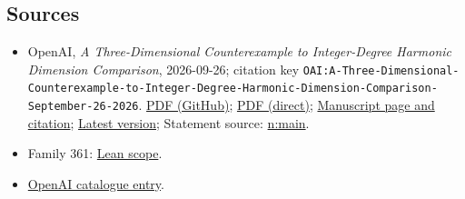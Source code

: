 \documentclass[11pt]{article}
\begin{document}
\subsection{Sources}
\begin{itemize}
\item OpenAI, \emph{A Three-Dimensional Counterexample to Integer-Degree Harmonic Dimension Comparison}, 2026-09-26; citation key \texttt{OAI:A-Three-Dimensional-Counterexample-to-Integer-Degree-Harmonic-Dimension-Comparison-September-26-2026}. \href{https://github.com/openai/math/blob/adc7f1241b42e322a6451854ab7e4b4c146bf78a/preprints/A-Three-Dimensional-Counterexample-to-Integer-Degree-Harmonic-Dimension-Comparison-September-26-2026/paper.pdf}{PDF (GitHub)}; \href{https://github.com/openai/math/raw/adc7f1241b42e322a6451854ab7e4b4c146bf78a/preprints/A-Three-Dimensional-Counterexample-to-Integer-Degree-Harmonic-Dimension-Comparison-September-26-2026/paper.pdf}{PDF (direct)}; \href{https://github.com/openai/math/blob/adc7f1241b42e322a6451854ab7e4b4c146bf78a/preprints/A-Three-Dimensional-Counterexample-to-Integer-Degree-Harmonic-Dimension-Comparison-September-26-2026/README.md}{Manuscript page and citation}; \href{https://github.com/openai/math/blob/main/preprints/A-Three-Dimensional-Counterexample-to-Integer-Degree-Harmonic-Dimension-Comparison-September-26-2026/paper.pdf}{Latest version}; Statement source: \href{https://github.com/openai/math/blob/adc7f1241b42e322a6451854ab7e4b4c146bf78a/preprints/A-Three-Dimensional-Counterexample-to-Integer-Degree-Harmonic-Dimension-Comparison-September-26-2026/build/sections/introduction.tex\#L31}{n:main}.
\item Family 361: \href{https://github.com/openai/math/blob/adc7f1241b42e322a6451854ab7e4b4c146bf78a/lean/docs/361.md}{Lean scope}.
\item \href{https://github.com/openai/math/blob/adc7f1241b42e322a6451854ab7e4b4c146bf78a/CONTENTS.md}{OpenAI catalogue entry}.
\end{itemize}
\end{document}
